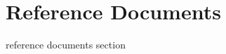 \documentclass[../../../../dd.tex]{subfiles}
\begin{document}
	\section{Reference Documents}

	reference documents section
\end{document}
